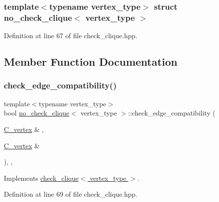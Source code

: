 \subsubsection*{template$<$typename vertex\+\_\+type$>$\newline
struct no\+\_\+check\+\_\+clique$<$ vertex\+\_\+type $>$}



Definition at line 67 of file check\+\_\+clique.\+hpp.



\subsection{Member Function Documentation}
\mbox{\label{structno__check__clique_a8b4c77a0a9cf081c5698aed9a190a5fb}} 
\subsubsection{\texorpdfstring{check\+\_\+edge\+\_\+compatibility()}{check\_edge\_compatibility()}}
{\footnotesize\ttfamily template$<$typename vertex\+\_\+type$>$ \\
bool \hyperlink{structno__check__clique}{no\+\_\+check\+\_\+clique}$<$ vertex\+\_\+type $>$\+::check\+\_\+edge\+\_\+compatibility (\begin{DoxyParamCaption}\item[{\hyperlink{clique__covering__graph_8hpp_a9cb45047ea8c5ed95a8cfa90494345aa}{C\+\_\+vertex} \&}]{,  }\item[{\hyperlink{clique__covering__graph_8hpp_a9cb45047ea8c5ed95a8cfa90494345aa}{C\+\_\+vertex} \&}]{ }\end{DoxyParamCaption})\hspace{0.3cm}{\ttfamily [inline]}, {\ttfamily [override]}, {\ttfamily [virtual]}}



Implements \hyperlink{structcheck__clique_a5d5ad28e723a12d105f578360959ec53}{check\+\_\+clique$<$ vertex\+\_\+type $>$}.



Definition at line 69 of file check\+\_\+clique.\+hpp.

\mbox{\label{structno__check__clique_a1eea58910487023f2e2c323ec73490d7}} 
